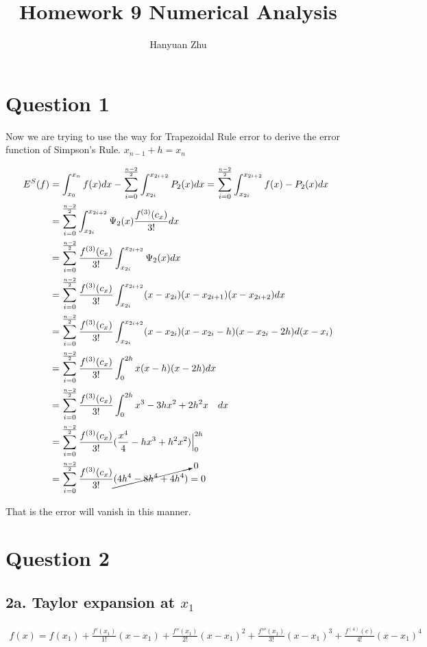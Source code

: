 \documentclass{article}
\title{Homework 9 Numerical Analysis}
\author{Hanyuan Zhu}
\date{}
\begin{document}
\maketitle


\section*{Question 1}

Now we are trying to use the way for Trapezoidal Rule error to derive the error function of Simpson’s Rule.
$x_{n-1} + h = x_n$

\begin{equation}
  \begin{split}
    E^{S}(f) &= \int_{x_0}^{x_n} f(x) dx - \sum^{\frac{n-2}{2}}_{i=0} \int_{x_{2i}}^{x_{2i+2}} P_2 (x) dx = \sum^{\frac{n-2}{2}}_{i=0} \int_{x_{2i}}^{x_{2i+2}} f(x)-P_2 (x) dx \\
    &=  \sum^{\frac{n-2}{2}}_{i=0} \int_{x_{2i}}^{x_{2i+2}} \Psi_2 (x) \frac{f^{(3)}(c_x)}{3!} dx \\
    &=  \sum^{\frac{n-2}{2}}_{i=0} \frac{f^{(3)}(c_x)}{3!} \int_{x_{2i}}^{x_{2i+2}} \Psi_2 (x)  dx \\
    &=  \sum^{\frac{n-2}{2}}_{i=0} \frac{f^{(3)}(c_x)}{3!} \int_{x_{2i}}^{x_{2i+2}} (x - x_{2i})(x - x_{2i+1})(x - x_{2i+2}) dx \\
    &=  \sum^{\frac{n-2}{2}}_{i=0} \frac{f^{(3)}(c_x)}{3!} \int_{x_{2i}}^{x_{2i+2}} (x - x_{2i})(x - x_{2i} - h)(x - x_{2i} - 2h) d(x-x_i) \\
    &=  \sum^{\frac{n-2}{2}}_{i=0} \frac{f^{(3)}(c_x)}{3!} \int_{0}^{2h} x (x - h)(x - 2h) dx \\
    &=  \sum^{\frac{n-2}{2}}_{i=0} \frac{f^{(3)}(c_x)}{3!} \int_{0}^{2h} x^3 - 3hx^2 +2h^2x \quad dx \\
    &=  \sum^{\frac{n-2}{2}}_{i=0} \frac{f^{(3)}(c_x)}{3!} (\frac{x^4}{4} - hx^3 +h^2x^2) \Big\vert^{2h}_0 \\
    &=  \sum^{\frac{n-2}{2}}_{i=0} \frac{f^{(3)}(c_x)}{3!} \cancelto{0}{( 4h^4 - 8h^4 + 4 h^4)} = 0\\
  \end{split}
\end{equation}

That is the error will vanish in this manner.


\section*{Question 2}
\subsection*{2a. Taylor expansion at $x_1$}
\begin{equation}
  \begin{split}
    f(x) = f(x_1) + \frac{f'(x_1)}{1!}(x-x_1) + \frac{f''(x_1)}{2!} (x-x_1)^2 + \frac{f'''(x_1)}{3!} (x-x_1)^3 + \frac{f^{(4)} (c)}{4!} (x-x_1)^4
  \end{split}
\end{equation}
\end{document}
